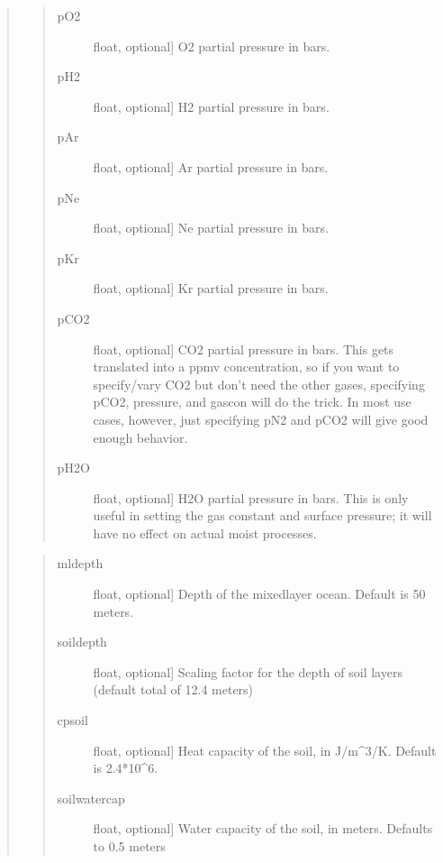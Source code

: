 \documentclass[letterpaper,10pt,english]{sphinxmanual}
\begin{document}
\begin{fulllineitems}
\begin{fulllineitems}
\begin{quote}
\begin{quote}
\begin{description}
\item[{pO2}] \leavevmode{[}float, optional{]}
O2 partial pressure in bars.

\item[{pH2}] \leavevmode{[}float, optional{]}
H2 partial pressure in bars.

\item[{pAr}] \leavevmode{[}float, optional{]}
Ar partial pressure in bars.

\item[{pNe}] \leavevmode{[}float, optional{]}
Ne partial pressure in bars.

\item[{pKr}] \leavevmode{[}float, optional{]}
Kr partial pressure in bars.

\item[{pCO2}] \leavevmode{[}float, optional{]}
CO2 partial pressure in bars. This gets translated into a ppmv concentration, so if you want to specify/vary CO2 but don’t need the other gases, specifying pCO2, pressure, and gascon will do the trick. In most use cases, however, just specifying pN2 and pCO2 will give good enough behavior.

\item[{pH2O}] \leavevmode{[}float, optional{]}
H2O partial pressure in bars. This is only useful in setting the gas constant and surface pressure; it will have no effect on actual moist processes.

\end{description}
\end{quote}

\begin{quote}
\begin{description}
\item[{mldepth}] \leavevmode{[}float, optional{]}
Depth of the mixed\sphinxhyphen{}layer ocean. Default is 50 meters.

\item[{soildepth}] \leavevmode{[}float, optional{]}
Scaling factor for the depth of soil layers (default total of 12.4 meters)

\item[{cpsoil}] \leavevmode{[}float, optional{]}
Heat capacity of the soil, in J/m\textasciicircum{}3/K. Default is 2.4*10\textasciicircum{}6.

\item[{soilwatercap}] \leavevmode{[}float, optional{]}
Water capacity of the soil, in meters. Defaults to 0.5 meters


\end{description}
\end{quote}
\end{quote}
\end{fulllineitems}
\end{fulllineitems}
\end{document}
